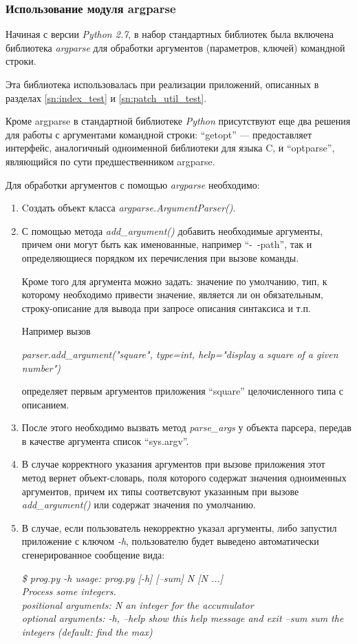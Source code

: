 \subsubsection{Использование модуля argparse}
Начиная с версии \textit{Python 2.7}, в набор стандартных библиотек была включена 
библиотека \textit{argparse} для обработки аргументов (параметров, ключей) командной строки.

Эта библиотека использовалась при реализации приложений, описанных 
в разделах \ref{sn:index_test} и \ref{sn:patch_util_test}.

Кроме argparse в стандартной библиотеке \textit{Python} присутствуют еще два
решения для работы с аргументами командной строки: 
``getopt'' --- предоставляет интерфейс, аналогичный одноименной библиотеки для языка C,
и ``optparse'', являющийся по сути предшественником argparse.

Для обработки аргументов с помощью \textit{argparse} необходимо:
\begin{enumerate}
\item
Cоздать объект класса \textit{argparse.ArgumentParser()}.
\item
С помощью метода \textit{add\_argument()} добавить необходимые аргументы, причем они могут быть как
именованные, например ``-\ -path'', так и определяющиеся порядком их перечисления при вызове команды.

Кроме того для аргумента можно задать: значение по умолчанию, тип, к которому необходимо привести значение,
является ли он обязательным, строку-описание для вывода при запросе описания синтаксиса и т.п.

Например вызов

\textit{parser.add\_argument("square", type=int, help="display a square of a given number")}

определяет первым аргументов приложения ``square'' целочисленного типа с описанием.
\item
После этого необходимо вызвать метод \textit{parse\_args} у объекта парсера,
передав в качестве аргумента список ``sys.argv''.
\item
В случае корректного указания аргументов при вызове приложения
этот метод вернет объект-словарь, поля которого содержат значения одноименных
аргументов, причем их типы соответсвуют указанным при вызове \textit{add\_argument()}
или содержат значения по умолчанию.
\item
В случае, если пользователь некорректно указал аргументы, либо запустил приложение
с ключом \textit{-h}, пользователю будет выведено автоматически сгенерированное сообщение
вида:

\textit{\$ prog.py -h
usage: prog.py [-h] [--sum] N [N ...]\\
Process some integers.\\
positional arguments:
 N           an integer for the accumulator\\
optional arguments:
 -h, --help  show this help message and exit
 --sum       sum the integers (default: find the max)
}
\end{enumerate}

